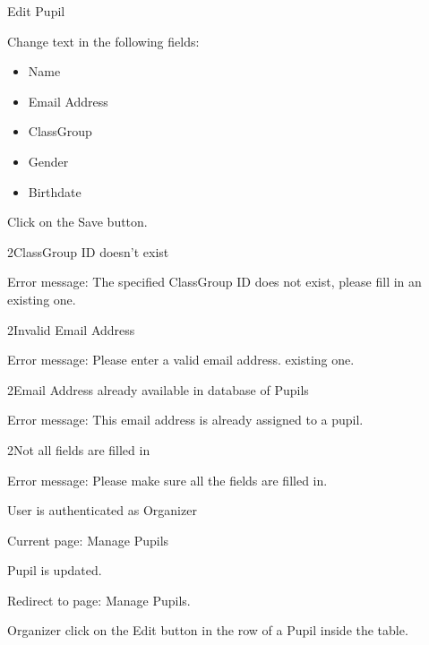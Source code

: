 
\begin{uc}{Edit Pupil}


    \begin{uc-mss}
    \item Change text in the following fields:
        \begin{itemize}
			\item Name
			\item Email Address
			\item ClassGroup
			\item Gender
			\item Birthdate
		\end{itemize}
    \item Click on the Save button.
    \end{uc-mss}

    \begin{uc-ext}

        \begin{uc-fail}{2}{ClassGroup ID doesn't exist}
        \item Error message: The specified ClassGroup ID does not exist, please
            fill in an existing one.
        \end{uc-fail}

        \begin{uc-fail}{2}{Invalid Email Address}
        \item Error message: Please enter a valid email address. existing one.
        \end{uc-fail}

        \begin{uc-fail}{2}{Email Address already available in database of
            Pupils}
        \item Error message: This email address is already assigned to a pupil.
        \end{uc-fail}

        \begin{uc-fail}{2}{Not all fields are filled in}
        \item Error message: Please make sure all the fields are filled in.
        \end{uc-fail}

    \end{uc-ext}

    \begin{uc-pre}
    \item User is authenticated as Organizer
    \item Current page: Manage Pupils
    \end{uc-pre}

    \begin{uc-post}
    \item Pupil is updated.
    \item Redirect to page: Manage Pupils.
    \end{uc-post}

    \begin{uc-trig}
        Organizer click on the Edit button in the row of a Pupil inside the
        table.
    \end{uc-trig}

\end{uc}
